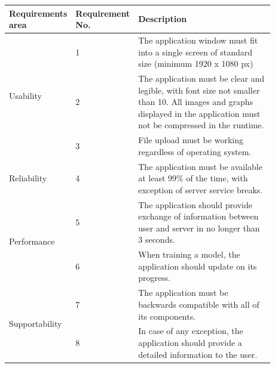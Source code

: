 \documentclass{article}
\begin{document}
\begin{center}
    \begin{tabular}{ |p{0.15\linewidth}|p{0.13\linewidth}|p{0.6\linewidth}| }
        \hline
        Requirements area                 & Requirement No. & Description                                                                                                                                                              \\
        \hline
        \multirow{3}{1em}{Usability}      & 1               &
        The application window must fit into a single screen of standard size (minimum 1920 x 1080 px)                                                                                                                                 \\
        \cline{2-3}
                                          & 2               & The application must be clear and legible, with font size not smaller than 10. All images and graphs displayed in the application must not be compressed in the runtime. \\
        \cline{2-3}
                                          & 3               & File upload must be working regardless of operating system.                                                                                                              \\
        \hline
        \multirow{1}{4em}{Reliability}    & 4               & The application must be available at least 99\% of the time, with exception of server service breaks.                                                                    \\
        \hline
        \multirow{2}{4em}{Performance}    & 5               & The application should provide exchange of information between user and server in no longer than 3 seconds.                                                              \\
        \cline{2-3}
                                          & 6               & When training a model, the application should update on its progress.                                                                                                    \\
        \hline
        \multirow{2}{4em}{Supportability} & 7               & The application must be backwards compatible with all of its components.                                                                                                 \\
        \cline{2-3}
                                          & 8               & In case of any exception, the application should provide a detailed information to the user.                                                                             \\
        \hline
    \end{tabular}
\end{center}
\end{document}
